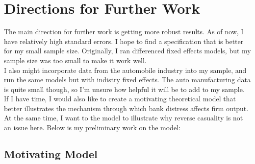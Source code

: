 \documentclass[letter,11pt]{article}
\begin{document}
{\section{Directions for Further Work}

\indent The main direction for further work is getting more robust results. As of now, I have relatively high standard errors. I hope to find a specification that is better for my small sample size. Originally, I ran differenced fixed effects models, but my sample size was too small to make it work well.
\\
\indent I also might incorporate data from the automobile industry into my sample, and run the same models but with indistry fixed effects. The auto manufacturing data is quite small though, so I'm unsure how helpful it will be to add to my sample. 
\\
\indent If I have time, I would also like to create a motivating theoretical model that better illustrates the mechanism through which bank distress affects firm output. At the same time, I want to the model to illustrate why reverse casuality is not an issue here. Below is my preliminary work on the model:

\subsection{Motivating Model}

}
\end{document}
